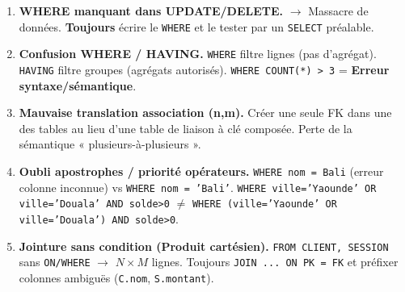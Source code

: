 \documentclass[11pt]{article}
\begin{document}
\begin{attention}
\begin{enumerate}
\item \textbf{WHERE manquant dans UPDATE/DELETE.} $\to$ Massacre de données. \textbf{Toujours} écrire le \texttt{WHERE} et le tester par un \texttt{SELECT} préalable.
\item \textbf{Confusion WHERE / HAVING.} \texttt{WHERE} filtre lignes (pas d'agrégat). \texttt{HAVING} filtre groupes (agrégats autorisés). \texttt{WHERE COUNT(*) > 3} = \textbf{Erreur syntaxe/sémantique}.
\item \textbf{Mauvaise translation association (n,m).} Créer une seule FK dans une des tables au lieu d'une table de liaison à clé composée. Perte de la sémantique « plusieurs-à-plusieurs ».
\item \textbf{Oubli apostrophes / priorité opérateurs.} \texttt{WHERE nom = Bali} (erreur colonne inconnue) vs \texttt{WHERE nom = 'Bali'}. \texttt{WHERE ville='Yaounde' OR ville='Douala' AND solde>0} $\neq$ \texttt{WHERE (ville='Yaounde' OR ville='Douala') AND solde>0}.
\item \textbf{Jointure sans condition (Produit cartésien).} \texttt{FROM CLIENT, SESSION} sans \texttt{ON/WHERE} $\to$ $N \times M$ lignes. Toujours \texttt{JOIN ... ON PK = FK} et préfixer colonnes ambiguës (\texttt{C.nom}, \texttt{S.montant}).
\end{enumerate}
\end{attention}
\end{document}
